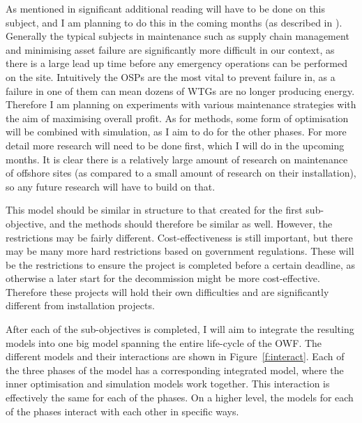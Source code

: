 \documentclass[a4paper,12pt]{article}
\begin{document}
\subobjtwo*

As mentioned in  significant additional reading will have to be done on this subject, and I am planning to do this in the coming months (as described in ). Generally the typical subjects in maintenance such as supply chain management and minimising asset failure are significantly more difficult in our context, as there is a large lead up time before any emergency operations can be performed on the site. Intuitively the OSPs are the most vital to prevent failure in, as a failure in one of them can mean dozens of WTGs are no longer producing energy. Therefore I am planning on experiments with various maintenance strategies with the aim of maximising overall profit. As for methods, some form of optimisation will be combined with simulation, as I aim to do for the other phases. For more detail more research will need to be done first, which I will do in the upcoming months.  It is clear there is a relatively large amount of research on maintenance of offshore sites (as compared to a small amount of research on their installation), so any future research will have to build on that.

\subobjthree*

This model should be similar in structure to that created for the first sub-objective, and the methods should therefore be similar as well. However, the restrictions may be fairly different. Cost-effectiveness is still important, but there may be many more hard restrictions based on government regulations. These will be the restrictions to ensure the project is completed before a certain deadline, as otherwise a later start for the decommission might be more cost-effective. Therefore these projects will hold their own difficulties and are significantly different from installation projects. 

\objectve*

After each of the sub-objectives is completed, I will aim to integrate the resulting models into one big model spanning the entire life-cycle of the OWF. The different models and their interactions are shown in Figure~\ref{f:interact}. Each of the three phases of the model has a corresponding integrated model, where the inner optimisation and simulation models work together. This interaction is effectively the same for each of the phases. On a higher level, the models for each of the phases interact with each other in specific ways. 
\end{document}
